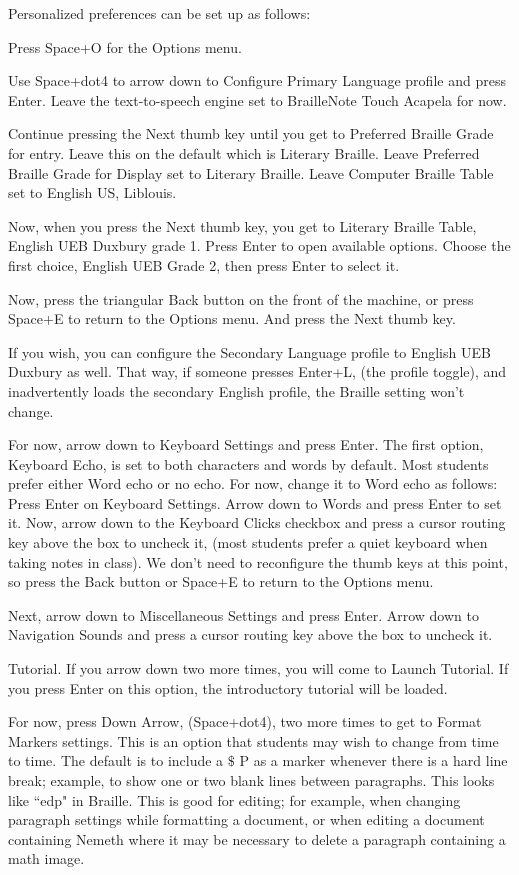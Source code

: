\documentclass[10pt,letterpaper,twoside]{report}
\begin{document}
{{{Personalized preferences can be set up as follows:

Press Space+O for the Options menu.

Use Space+dot4 to arrow down to Configure Primary Language profile and press Enter. Leave the text-to-speech engine set to BrailleNote Touch Acapela for now.

Continue pressing the Next thumb key until you get to Preferred Braille Grade for entry. Leave this on the default which is Literary Braille.
Leave Preferred Braille Grade for Display set to Literary Braille.
Leave Computer Braille Table set to English US, Liblouis.

Now, when you press the Next thumb key, you get to Literary Braille Table, English UEB Duxbury grade 1. Press Enter to open available options.
Choose the first choice, English UEB Grade 2, then press Enter to select it.

Now, press the triangular Back button on the front of the machine, or press Space+E to return to the Options menu. And press the Next thumb key.

If you wish, you can configure the Secondary Language profile to English UEB Duxbury as well. That way, if someone presses Enter+L, (the profile toggle), and inadvertently loads the secondary English profile, the Braille setting won't change.

For now, arrow down to Keyboard Settings and press Enter.
The first option, Keyboard Echo, is set to both characters and words by default. Most students prefer either Word echo or no echo. For now, change it to Word echo as follows:
Press Enter on Keyboard Settings.
Arrow down to Words and press Enter to set it.
Now, arrow down to the Keyboard Clicks checkbox and press a cursor routing key above the box to uncheck it, (most students prefer a quiet keyboard when taking notes in class).
We don't need to reconfigure the thumb keys at this point, so press the Back button or Space+E to return to the Options menu.

Next, arrow down to Miscellaneous Settings and press Enter.
Arrow down to Navigation Sounds and press a cursor routing key above the box to uncheck it.

Tutorial. If you arrow down two more times, you will come to Launch Tutorial. If you press Enter on this option, the introductory tutorial will be loaded.

For now, press Down Arrow, (Space+dot4), two more times to get to Format Markers settings. This is an option that students may wish to change from time to time. The default is to include a $\$$ P as a marker whenever there is a hard line break; example, to show one or two blank lines between paragraphs. This looks like ``edp" in Braille. This is good for editing; for example, when changing paragraph settings while formatting a document, or when editing a document containing Nemeth where it may be necessary to delete a paragraph containing a math image.

}}}
\end{document}

